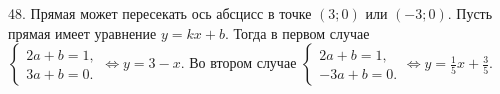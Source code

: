 48. Прямая может пересекать ось абсцисс в точке $(3;0)$ или $(-3;0).$ Пусть прямая имеет уравнение $y=kx+b.$ Тогда в первом случае $\begin{cases}2a+b=1,\\ 3a+b=0.\end{cases}\Leftrightarrow y=3-x.$ Во втором случае $\begin{cases}2a+b=1,\\ -3a+b=0.\end{cases}\Leftrightarrow y=\frac{1}{5}x+\frac{3}{5}.$\\
